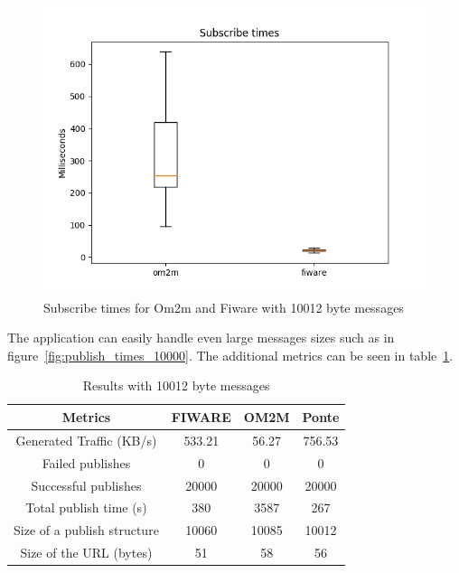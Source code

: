 \documentclass[conference]{IEEEtran}
\begin{document}
\begin{figure}[htbp!]
  \centering
  \includegraphics[width=\columnwidth]{figures/om2m_fiware_subscribe_times_10000.png}
  \caption{Subscribe times for Om2m and Fiware with 10012 byte messages}
  \label{fig:subscribe_times_10000}
\end{figure}

The application can easily handle even large messages sizes such as in figure~\ref{fig:publish_times_10000}. The additional metrics can be seen in table~\ref{tab:misc_metrics_all_10012}.

\begin{table}[htbp!]
  \centering
  \begin{tabular}{|c|c|c|c|}
    \hline 
    \textbf{Metrics} & \textbf{FIWARE} & \textbf{OM2M} & \textbf{Ponte} \\
    \hline 
    Generated Traffic (KB/s) & 533.21 & 56.27 & 756.53 \\
    \hline 
    Failed publishes & 0 & 0 & 0 \\
    \hline 
    Successful publishes & 20000 & 20000 & 20000 \\
    \hline 
    Total publish time (s) & 380 & 3587 & 267 \\
    \hline 
    Size of a publish structure & 10060 & 10085 & 10012 \\
    \hline 
    Size of the URL (bytes) & 51 & 58 & 56 \\
    \hline 
    
  \end{tabular}
  \vspace{1mm}
  \caption{Results with 10012 byte messages}
  \label{tab:misc_metrics_all_10012}
\end{table}
\end{document}
